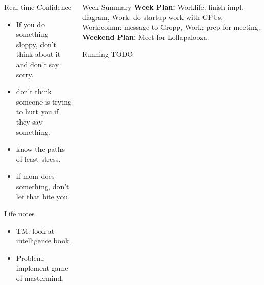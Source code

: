 \documentclass[serif, mathserif, final]{beamer}
\newcommand{\doneTask}[1]{\tiny \item \tiny \sout{#1}}
\newcommand{\comments}[1]{}
\begin{document}
\begin{frame}
\begin{columns}
\begin{column}{0.25\linewidth}
      \begin{block}{Real-time Confidence}
        \begin{itemize}
          \tiny \item \tiny If you do something sloppy, don't
          think about it and don't say sorry. 
        \item \tiny don't think someone is trying to hurt you if
          they say something.
        \item \tiny know the paths of least stress. 
        \item \tiny if mom does something, don't let that bite you. 
        \end{itemize}
      \end{block} 
      \begin{block}{Life notes} 
        \begin{itemize} 
        \item \tiny TM: look at intelligence book. 
        \item \tiny Problem: implement game of mastermind. 
        \end{itemize}     
      \end{block}
    \end{column} %

    \begin{column}{0.50\linewidth}
      \begin{block}{Week Summary}
        {\tiny \textbf{Week Plan:} Worklife: finish impl. diagram,
          Work: do startup work with GPUs, Work:comm: message to
          Gropp, Work: prep for meeting.} 
        {\tiny \textbf{Weekend Plan:} Meet for Lollapalooza.}  
      \end{block}


      \begin{block}{Running TODO} %
        \begin{enumerate}

\comments{
        \item \small Work(emagpuL0) = Work(emagpu): check implementation
          changes to library + Work(emagpu): check correctness that
          GPU will run simultaneously with CPU cores + \doneTask{Work: l1/ l2:
            see if you need to add on iteration adjustment} 
          + TODO: Work(emagpuL0): ``spawns'' vs spawns  vs. 

}
\end{enumerate}
\end{block}
\end{column}
\end{columns}
\end{frame}
\end{document}
